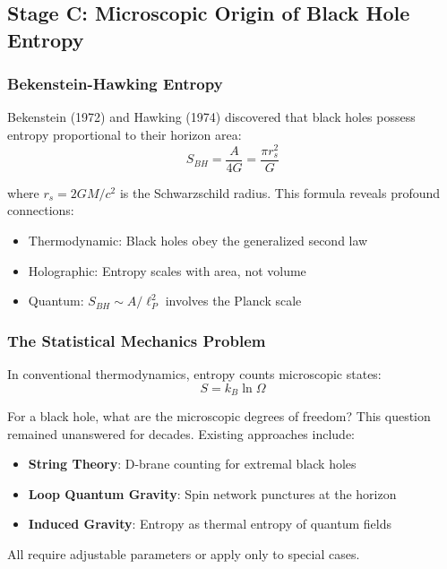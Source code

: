 \subsection{Stage C: Microscopic Origin of Black Hole Entropy}
\label{subsec:bh_entropy}

\subsubsection{Bekenstein-Hawking Entropy}

Bekenstein (1972) and Hawking (1974) discovered that black holes possess entropy proportional to their horizon area:
\begin{equation}
    S_{BH} = \frac{A}{4G} = \frac{\pi r_s^2}{G}
\end{equation}

where $r_s = 2GM/c^2$ is the Schwarzschild radius. This formula reveals profound connections:
\begin{itemize}
    \item Thermodynamic: Black holes obey the generalized second law
    \item Holographic: Entropy scales with area, not volume
    \item Quantum: $S_{BH} \sim A/\ell_P^2$ involves the Planck scale
\end{itemize}

\subsubsection{The Statistical Mechanics Problem}

In conventional thermodynamics, entropy counts microscopic states:
\begin{equation}
    S = k_B \ln \Omega
\end{equation}

For a black hole, what are the microscopic degrees of freedom? This question remained unanswered for decades. Existing approaches include:

\begin{itemize}
    \item \textbf{String Theory}: D-brane counting for extremal black holes
    \item \textbf{Loop Quantum Gravity}: Spin network punctures at the horizon
    \item \textbf{Induced Gravity}: Entropy as thermal entropy of quantum fields
\end{itemize}

All require adjustable parameters or apply only to special cases.

